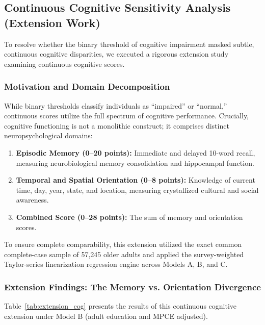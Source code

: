 \subsection{Continuous Cognitive Sensitivity Analysis (Extension Work)}
To resolve whether the binary threshold of cognitive impairment masked subtle, continuous cognitive disparities, we executed a rigorous extension study examining continuous cognitive scores.

\subsubsection{Motivation and Domain Decomposition}
While binary thresholds classify individuals as ``impaired'' or ``normal,'' continuous scores utilize the full spectrum of cognitive performance. Crucially, cognitive functioning is not a monolithic construct; it comprises distinct neuropsychological domains:
\begin{enumerate}
    \item \textbf{Episodic Memory (0--20 points):} Immediate and delayed 10-word recall, measuring neurobiological memory consolidation and hippocampal function.
    \item \textbf{Temporal and Spatial Orientation (0--8 points):} Knowledge of current time, day, year, state, and location, measuring crystallized cultural and social awareness.
    \item \textbf{Combined Score (0--28 points):} The sum of memory and orientation scores.
\end{enumerate}

To ensure complete comparability, this extension utilized the exact common complete-case sample of 57,245 older adults and applied the survey-weighted Taylor-series linearization regression engine across Models A, B, and C.

\subsubsection{Extension Findings: The Memory vs. Orientation Divergence}
Table~\ref{tab:extension_cog} presents the results of this continuous cognitive extension under Model B (adult education and MPCE adjusted).

